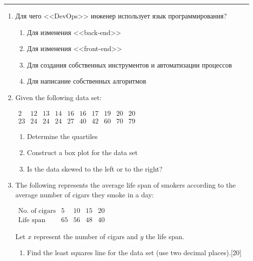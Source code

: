 \documentclass[11pt]{article}
\begin{document}
\Large
{}
\medskip\hrule
\begin{enumerate}

\item Для чего <<DevOps>> инженер использует язык программирования?
\begin{enumerate}
    \item Для изменения <<back-end>>
    \item Для изменения <<front-end>>
    \item Для создания собственных инструментов и автоматизации процессов
    \item Для написание собственных алгоритмов
\end{enumerate}






\item Given the following data set:
 \begin{center}
$%
\begin{array}{cccccccccc}
2 & 12 & 13 & 14 & 16 & 16 & 17 & 19 & 20 & 20  \\
23 & 24 & 24 & 24 & 27 & 40 & 42 & 60 & 70 & 79 %
\end{array}%
$
\end{center}

\begin{enumerate}
    \item Determine the quartiles
    \item Construct a box plot for the data set
    \item Is the data skewed to the left or to the right?
\end{enumerate}

\item The following represents the average life span of  smokers according to the average number of cigars they smoke in a day:
\begin{center}
$%
\begin{array}{ccccc}
\text{No. of cigars} & 5 & 10 & 15 & 20
\\
\text{Life span} & 65 & 56 & 48 & 40 %
\end{array}%
$
\end{center}
Let $x$ represent the number of cigars and $y$ the life span.
\begin{enumerate}
\item Find the least squares line for the data set (use two decimal places).\hfill[20]


\end{enumerate}
\end{enumerate}
\end{document}

